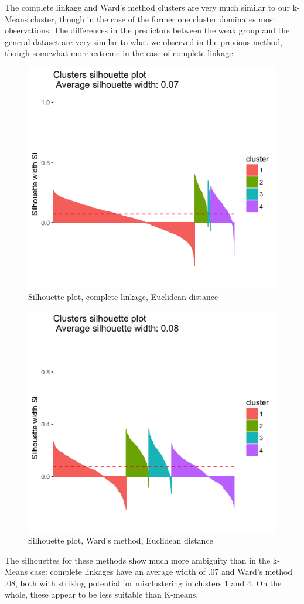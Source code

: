 \documentclass[10pt,a4paper, hidelinks]{article} %
\begin{document}
The complete linkage and Ward's method clusters are very much similar to our k-Means cluster, though in the case of the former one cluster dominates most observations.  The differences in the predictors between the weak group and the general dataset are very similar to what we observed in the previous method, though somewhat more extreme in the case of complete linkage.

\begin{figure}[H]
	\centering
	\includegraphics[width=0.7\linewidth]{"../fig/compsil"}
		\caption{Silhouette plot, complete linkage, Euclidean distance}
\end{figure}

\begin{figure}[H]
	\centering
	\includegraphics[width=0.7\linewidth]{"../fig/wardsil"}
		\caption{Silhouette plot, Ward's method, Euclidean distance}
\end{figure}

The silhouettes for these methods show much more ambiguity than in the k-Means case: complete linkages have an average width of .07 and Ward's method .08, both with striking potential for misclustering in clusters 1 and 4.  On the whole, these appear to be less suitable than K-means.
\end{document}
